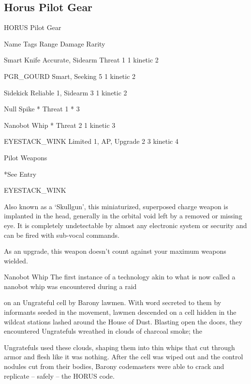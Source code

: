 \subsection{Horus Pilot Gear}

                                          HORUS Pilot Gear

 Name                   Tags                                   Range           Damage                Rarity

 Smart Knife            Accurate, Sidearm                     Threat 1         1 kinetic              2

 PGR\_GOURD              Smart, Seeking                         5               1 kinetic              2

 Sidekick               Reliable 1, Sidearm                    3               1 kinetic              2

 Null Spike             *                                     Threat 1        *                       3

 Nanobot Whip           *                                     Threat 2         1 kinetic              3

 EYESTACK\_WINK          Limited 1, AP, Upgrade                 2              3 kinetic               4

                                                Pilot Weapons

*See Entry


EYESTACK\_WINK

Also known as a ‘Skullgun’, this miniaturized, superposed charge weapon is implanted in the head,
generally in the orbital void left by a removed or missing eye. It is completely undetectable by almost any
electronic system or security and can be fired with sub-vocal commands.

As an upgrade, this weapon doesn’t count against your maximum weapons wielded.


Nanobot Whip
The first instance of a technology akin to what is now called a nanobot whip was encountered during a raid

on an Ungrateful cell by Barony lawmen. With word secreted to them by informants seeded in the
movement, lawmen descended on a cell hidden in the wildcat stations lashed around the House of Dust.
Blasting open the doors, they encountered Ungratefuls wreathed in clouds of charcoal smoke; the

Ungratefuls used these clouds, shaping them into thin whips that cut through armor and flesh like it was
nothing. After the cell was wiped out and the control nodules cut from their bodies, Barony codemasters
were able to crack and replicate -- safely -- the HORUS code.

